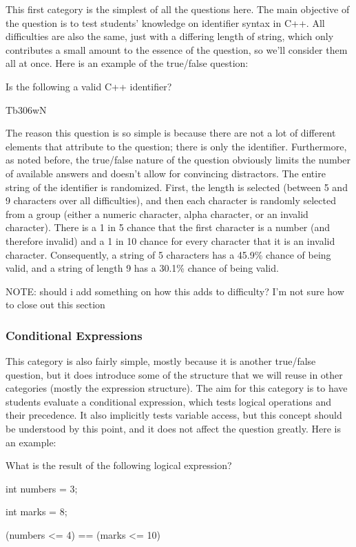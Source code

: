\documentclass{article}
\begin{document}
This first category is the simplest of all the questions here. The main objective of the question is to test students' knowledge on identifier syntax in C++.
All difficulties are also the same, just with a differing length of string, which only contributes a small amount to the essence of the question, so we'll consider
them all at once.
Here is an example of the true/false question:

\hfill \par
Is the following a valid C++ identifier? \par
Tb306wN 

\hfill \par

The reason this question is so simple is because there are not a lot of different elements that attribute to the question; there is only the identifier.
Furthermore, as noted before, the true/false nature of the question obviously limits the number of available answers and doesn't allow for convincing distractors.
The entire string of the identifier is randomized. First, the length is selected (between 5 and 9 characters over all difficulties), and then each character is randomly selected from
a group (either a numeric character, alpha character, or an invalid character). There is a 1 in 5 chance that the first character is a number (and therefore invalid)
and a 1 in 10 chance for every character that it is an invalid character. Consequently, a string of 5 characters has a 45.9\% chance of being valid, and a string of
length 9 has a 30.1\% chance of being valid.

NOTE: should i add something on how this adds to difficulty? I'm not sure how to close out this section

\subsubsection{Conditional Expressions}
This category is also fairly simple, mostly because it is another true/false question, but it does introduce some of the structure that we will reuse in other
categories (mostly the expression structure). The aim for this category is to have students evaluate a conditional expression, which tests logical operations
and their precedence. It also implicitly tests variable access, but this concept should be understood by this point, and it does not affect the question greatly.
Here is an example:

\hfill \par
What is the result of the following logical expression? \par
int numbers = 3; \par
int marks = 8; \par
(numbers \textless= 4) == (marks \textless= 10) \par
\end{document}

